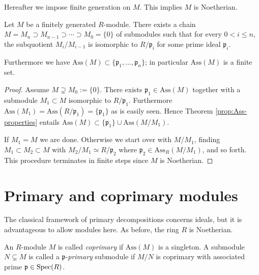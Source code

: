 Hereafter we impose finite generation on $M$. This implies $M$ is Noetherian.
\begin{theorem}
	Let $M$ be a finitely generated $R$-module. There exists a chain $M = M_n \supset M_{n-1} \supset \cdots \supset M_0 = \{0\}$ of submodules such that for every $0 < i \leq n$, the subquotient $M_i/M_{i-1}$ is isomorphic to $R/\mathfrak{p}_i$ for some prime ideal $\mathfrak{p}_i$.
	
	Furthermore we have $\text{Ass}(M) \subset \{\mathfrak{p}_1, \ldots, \mathfrak{p}_n \}$; in particular $\text{Ass}(M)$ is a finite set.
\end{theorem}
\begin{proof}
	Assume $M \supsetneq M_0 := \{0\}$. There exists $\mathfrak{p}_1 \in \text{Ass}(M)$ together with a submodule $M_1 \subset M$ isomorphic to $R/\mathfrak{p}_1$. Furthermore $\text{Ass}(M_1) = \text{Ass}(R/\mathfrak{p}_1) = \{ \mathfrak{p}_1\}$ as is easily seen. Hence Theorem \ref{prop:Ass-properties} entails $\text{Ass}(M) \subset \{\mathfrak{p}_1\} \cup \text{Ass}(M/M_1)$.

	If $M_1 = M$ we are done. Otherwise we start over with $M/M_1$, finding $M_1 \subset M_2 \subset M$ with $M_2/M_1 \simeq R/\mathfrak{p}_2$ where $\mathfrak{p}_2 \in \text{Ass}_R(M/M_1)$, and so forth. This procedure terminates in finite steps since $M$ is Noetherian.
\end{proof}

\section{Primary and coprimary modules}
The classical framework of primary decompositions concerns ideals, but it is advantageous to allow modules here. As before, the ring $R$ is Noetherian.

\begin{definition}
	An $R$-module $M$ is called \emph{coprimary} if $\text{Ass}(M)$ is a singleton. A submodule $N \subsetneq M$ is called a $\mathfrak{p}$-\emph{primary} submodule if $M/N$ is coprimary with associated prime $\mathfrak{p} \in \operatorname{Spec}(R)$.
\end{definition}

